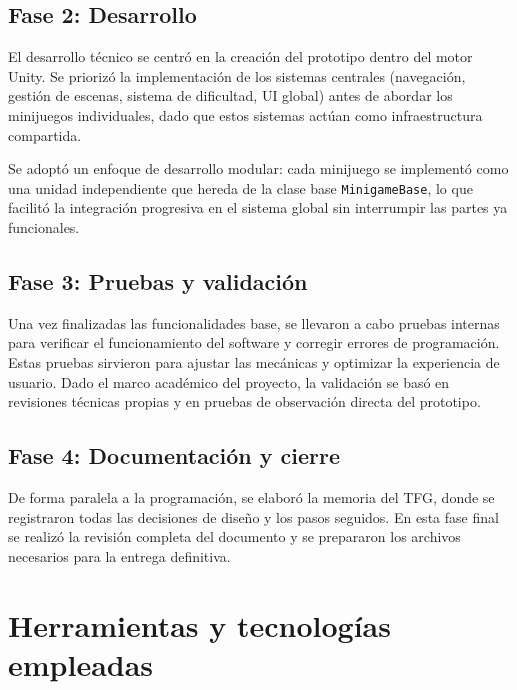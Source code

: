 \documentclass[12pt, a4paper]{report}
\begin{document}
\subsection{Fase 2: Desarrollo}

El desarrollo técnico se centró en la creación del prototipo dentro del motor
Unity. Se priorizó la implementación de los sistemas centrales (navegación,
gestión de escenas, sistema de dificultad, UI global) antes de abordar los
minijuegos individuales, dado que estos sistemas actúan como infraestructura
compartida.

Se adoptó un enfoque de desarrollo modular: cada minijuego se implementó como
una unidad independiente que hereda de la clase base \texttt{MinigameBase},
lo que facilitó la integración progresiva en el sistema global sin interrumpir
las partes ya funcionales.

\subsection{Fase 3: Pruebas y validación}

Una vez finalizadas las funcionalidades base, se llevaron a cabo pruebas
internas para verificar el funcionamiento del software y corregir errores de
programación. Estas pruebas sirvieron para ajustar las mecánicas y optimizar
la experiencia de usuario. Dado el marco académico del proyecto, la validación
se basó en revisiones técnicas propias y en pruebas de observación directa del
prototipo.

\subsection{Fase 4: Documentación y cierre}

De forma paralela a la programación, se elaboró la memoria del TFG, donde se
registraron todas las decisiones de diseño y los pasos seguidos. En esta fase
final se realizó la revisión completa del documento y se prepararon los archivos
necesarios para la entrega definitiva.

\section{Herramientas y tecnologías empleadas}
\end{document}
